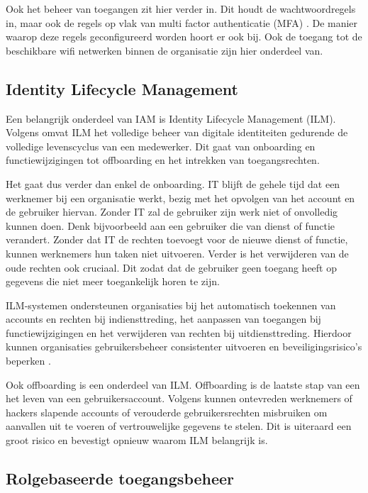 Ook het beheer van toegangen zit hier verder in. Dit houdt de wachtwoordregels in, maar ook de regels op vlak van multi factor authenticatie (MFA) \autocite{Microsoft2026}. De manier waarop deze regels geconfigureerd worden hoort er ook bij. Ook de toegang tot de beschikbare wifi netwerken binnen de organisatie zijn hier onderdeel van. 

\subsection{Identity Lifecycle Management}

Een belangrijk onderdeel van IAM is Identity Lifecycle Management (ILM). Volgens \autocite{OneIdentity2023} omvat ILM het volledige beheer van digitale identiteiten gedurende de volledige levenscyclus van een medewerker. Dit gaat van onboarding en functiewijzigingen tot offboarding en het intrekken van toegangsrechten.

Het gaat dus verder dan enkel de onboarding. IT blijft de gehele tijd dat een werknemer bij een organisatie werkt, bezig met het opvolgen van het account en de gebruiker hiervan. Zonder IT zal de gebruiker zijn werk niet of onvolledig kunnen doen. Denk bijvoorbeeld aan een gebruiker die van dienst of functie verandert. Zonder dat IT de rechten toevoegt voor de nieuwe dienst of functie, kunnen werknemers hun taken niet uitvoeren. Verder is het verwijderen van de oude rechten ook cruciaal. Dit zodat dat de gebruiker geen toegang heeft op gegevens die niet meer toegankelijk horen te zijn. 

ILM-systemen ondersteunen organisaties bij het automatisch toekennen van accounts en rechten bij indiensttreding, het aanpassen van toegangen bij functiewijzigingen en het verwijderen van rechten bij uitdiensttreding. Hierdoor kunnen organisaties gebruikersbeheer consistenter uitvoeren en beveiligingsrisico's beperken \autocite{OneIdentity2023}.

Ook offboarding is een onderdeel van ILM. Offboarding is de laatste stap van een het leven van een gebruikersaccount. Volgens \textcite{Cyberark} kunnen ontevreden werknemers of hackers slapende accounts of verouderde gebruikersrechten misbruiken om aanvallen uit te voeren of vertrouwelijke gegevens te stelen. Dit is uiteraard een groot risico en bevestigt opnieuw waarom ILM belangrijk is.

\subsection{Rolgebaseerde toegangsbeheer}

